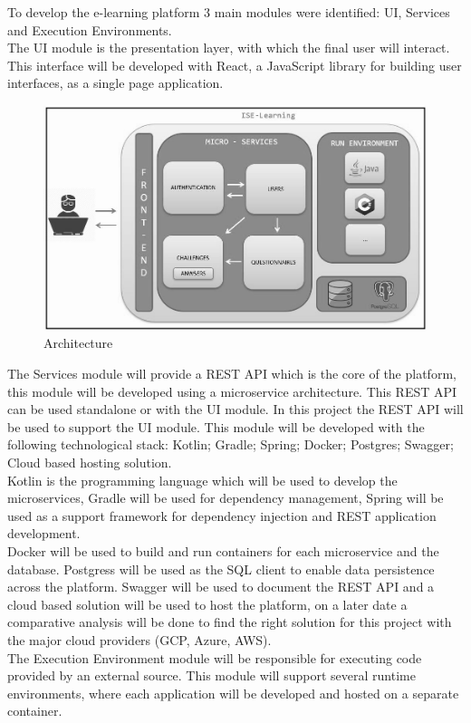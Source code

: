 To develop the e-learning platform 3 main modules were identified: UI, Services and Execution Environments.
\\
The UI module is the presentation layer, with which the final user will interact. This interface will be developed with React, a JavaScript library for building user interfaces, as a single page application.
\\
	\begin{figure}
  		\includegraphics[scale=0.6]{./imgs/arquitectura.JPG}
  		\caption{Architecture}
  		\label{fig:architecture}
	\end{figure} 
The Services module will provide a REST API which is the core of the platform, this module will be developed using a microservice architecture. This REST API can be used standalone or with the UI module. In this project the REST API will be used to support the UI module. This module will be developed with the following technological stack: Kotlin; Gradle; Spring; Docker; Postgres; Swagger; Cloud based hosting solution.
\\
Kotlin is the programming language which will be used to develop the microservices, Gradle will be used for dependency management, Spring will be used as a support framework for dependency injection and REST application development.
\\
Docker will be used to build and run containers for each microservice and the database. Postgress will be used as the SQL client to enable data persistence across the platform. Swagger will be used to document the REST API and a cloud based solution will be used to host the platform, on a later date a comparative analysis will be done to find the right solution for this project with the major cloud providers (GCP, Azure, AWS).
\\
 
The Execution Environment module will be responsible for executing code provided by an external source. This module will support several runtime environments, where each application will be developed and hosted on a separate container.
\\